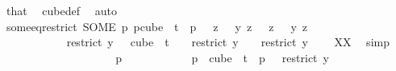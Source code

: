 \begin{isabellebody}
\ that\ \isamarkupfalse%
\ cube{\isacharunderscore}{\kern0pt}def\ \isamarkupfalse%
\ auto\isanewline
\isanewline
\ \ \ \ \ \ \ \ \isamarkupfalse%
\ some{\isacharunderscore}{\kern0pt}eq{\isacharunderscore}{\kern0pt}restrict{\isacharcolon}{\kern0pt}\ {\isachardoublequoteopen}{\isacharparenleft}{\kern0pt}SOME\ p{\isachardot}{\kern0pt}\ p{\isasymin}cube\ {}\ {\isacharparenleft}{\kern0pt}t{\isacharplus}{\kern0pt}{}{\isacharparenright}{\kern0pt}\ {\isasymand}\ p\ {}\ {\isacharequal}{\kern0pt}\ {\isacharparenleft}{\kern0pt}{\isacharparenleft}{\kern0pt}{\isasymlambda}z\ {\isasymin}\ {\isacharbraceleft}{\kern0pt}{\isachardot}{\kern0pt}{\isachardot}{\kern0pt}{\isacharless}{\kern0pt}{}{\isacharbraceright}{\kern0pt}{\isachardot}{\kern0pt}\ y\ z{\isacharparenright}{\kern0pt}\ {}{\isacharparenright}{\kern0pt}{\isacharparenright}{\kern0pt}\ {\isacharequal}{\kern0pt}\ {\isacharparenleft}{\kern0pt}{\isasymlambda}z\ {\isasymin}\ {\isacharbraceleft}{\kern0pt}{\isachardot}{\kern0pt}{\isachardot}{\kern0pt}{\isacharless}{\kern0pt}{}{\isacharbraceright}{\kern0pt}{\isachardot}{\kern0pt}\ y\ z{\isacharparenright}{\kern0pt}{\isachardoublequoteclose}\isanewline
\ \ \ \ \ \ \ \ \isamarkupfalse%
\ \isanewline
\ \ \ \ \ \ \ \ \ \ \isamarkupfalse%
\ {\isachardoublequoteopen}restrict\ y\ {\isacharbraceleft}{\kern0pt}{\isachardot}{\kern0pt}{\isachardot}{\kern0pt}{\isacharless}{\kern0pt}{}{\isacharbraceright}{\kern0pt}\ {\isasymin}\ cube\ {}\ {\isacharparenleft}{\kern0pt}t\ {\isacharplus}{\kern0pt}\ {}{\isacharparenright}{\kern0pt}\ {\isasymand}\ restrict\ y\ {\isacharbraceleft}{\kern0pt}{\isachardot}{\kern0pt}{\isachardot}{\kern0pt}{\isacharless}{\kern0pt}{}{\isacharbraceright}{\kern0pt}\ {}\ {\isacharequal}{\kern0pt}\ restrict\ y\ {\isacharbraceleft}{\kern0pt}{\isachardot}{\kern0pt}{\isachardot}{\kern0pt}{\isacharless}{\kern0pt}{}{\isacharbraceright}{\kern0pt}\ {}{\isachardoublequoteclose}\ \isamarkupfalse%
\ XX\ \isamarkupfalse%
\ simp\isanewline
\ \ \ \ \ \ \ \ \isamarkupfalse%
\isanewline
\ \ \ \ \ \ \ \ \ \ \isamarkupfalse%
\ p\isanewline
\ \ \ \ \ \ \ \ \ \ \isamarkupfalse%
\ {\isachardoublequoteopen}p\ {\isasymin}\ cube\ {}\ {\isacharparenleft}{\kern0pt}t{\isacharplus}{\kern0pt}{}{\isacharparenright}{\kern0pt}\ {\isasymand}\ p\ {}\ {\isacharequal}{\kern0pt}\ restrict\ y\ {\isacharbraceleft}{\kern0pt}{\isachardot}{\kern0pt}{\isachardot}{\kern0pt}{\isacharless}{\kern0pt}{}{\isacharbraceright}{\kern0pt}\ {}{\isachardoublequoteclose}\isanewline

\end{isabellebody}
